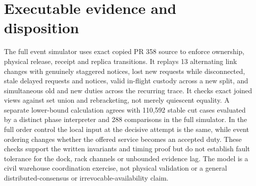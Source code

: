 \documentclass[11pt]{article}
\begin{document}
\section{Executable evidence and disposition}
The full event simulator uses exact copied PR 358 source to enforce ownership, physical release, receipt and replica transitions. It replays 13 alternating link changes with genuinely staggered notices, lost new requests while disconnected, stale delayed requests and notices, valid in-flight custody across a new split, and simultaneous old and new duties across the recurring trace. It checks exact joined views against set union and rebracketing, not merely quiescent equality. A separate lower-bound calculation agrees with 110,592 stable cut cases evaluated by a distinct phase interpreter and 288 comparisons in the full simulator. In the full order control the local input at the decisive attempt is the same, while event ordering changes whether the offered service becomes an accepted duty. These checks support the written invariants and timing proof but do not establish fault tolerance for the dock, rack channels or unbounded evidence lag. The model is a civil warehouse coordination exercise, not physical validation or a general distributed-consensus or irrevocable-availability claim.
\end{document}
